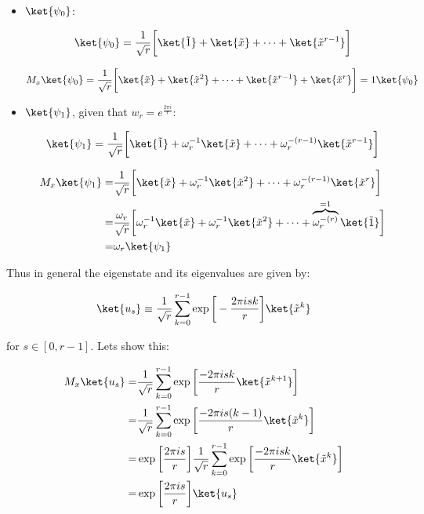 \begin{itemize}
    \item $\ket{\psi_0}$:

\begin{equation*}
    \ket{\psi_0} = \frac{1}{\sqrt{r}} \bigg[ \ket{\Tilde{1}} + \ket{\Tilde{x}} + \dots + \ket{\Tilde{x}^{r-1}} \bigg] 
\end{equation*}

\begin{equation*}
    M_x \ket{\psi_0} = \frac{1}{\sqrt{r}} \bigg[ \ket{\Tilde{x}} + \ket{\Tilde{x}^2} + \dots + \ket{\Tilde{x}^{r-1}} + \ket{\Tilde{x}^{r}} \bigg] = 1 \ket{\psi_0}
\end{equation*}

\item $\ket{\psi_1}$, given that $w_r = e^{\frac{2\pi i}{r}}$:

\begin{equation*}
    \ket{\psi_1} = \frac{1}{\sqrt{r}} \bigg[ \ket{\Tilde{1}} + \omega_r^{-1} \ket{\Tilde{x}} + \dots + \omega_r^{-(r-1)}\ket{\Tilde{x}^{r-1}} \bigg] 
\end{equation*}

\begin{equation*}
\begin{split}
    M_x\ket{\psi_1} = & \frac{1}{\sqrt{r}} \bigg[ \ket{\Tilde{x}} + \omega_r^{-1} \ket{\Tilde{x}^2} + \dots + \omega_r^{-(r-1)}\ket{\Tilde{x}^{r}} \bigg] \\
     = & \frac{\omega_r}{\sqrt{r}} \bigg[ \omega_r^{-1}\ket{\Tilde{x}} + \omega_r^{-1} \ket{\Tilde{x}^2} + \dots + \overbrace{\omega_r^{-(r)}}^{=1}\ket{\Tilde{1}} \bigg] \\
     = & \omega_r \ket{\psi_1}
\end{split}
\end{equation*}
\end{itemize}

Thus in general the eigenstate and its eigenvalues are given by:

\begin{equation}
    \ket{u_s} \equiv \frac{1}{\sqrt{r}} \sum_{k=0}^{r-1} \exp \bigg[ - \frac{2 \pi i s k }{r}\bigg] \ket{\Tilde{x}^k}
\end{equation}

for $s \in [0, r-1]$. Lets show this:

\begin{equation*}
\begin{split}
    M_x \ket{u_s} = & \frac{1}{\sqrt{r}} \sum_{k=0}^{r-1} \exp \bigg[ \frac{- 2 \pi i s k}{r} \ket{\Tilde{x}^{k+1}}\bigg] \\
                  = & \frac{1}{\sqrt{r}} \sum_{k=0}^{r-1} \exp \bigg[ \frac{- 2 \pi i s (k-1)}{r} \ket{\Tilde{x}^{k}}\bigg] \\
                  = & \exp \bigg[ \frac{2 \pi i s}{r}\bigg] \frac{1} {\sqrt{r}} \sum_{k=0}^{r-1} \exp \bigg[ \frac{- 2 \pi i s k}{r} \ket{\Tilde{x}^{k}}\bigg] \\
                  = & \exp \bigg[ \frac{2 \pi i s }{r} \bigg] \ket{u_s}
\end{split}    
\end{equation*}

